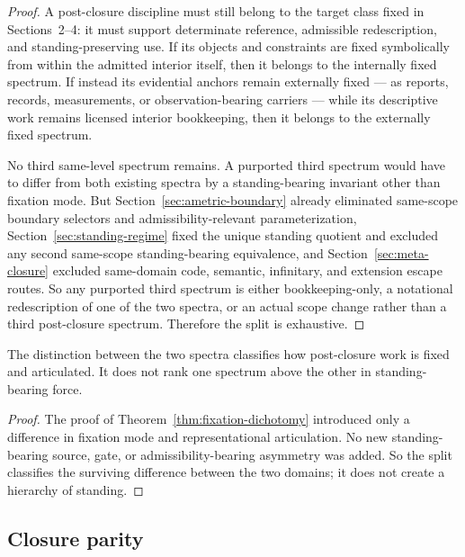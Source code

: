 \begin{proof}
A post-closure discipline must still belong to the target class fixed in Sections~2--4: it must support determinate reference, admissible redescription, and standing-preserving use. If its objects and constraints are fixed symbolically from within the admitted interior itself, then it belongs to the internally fixed spectrum. If instead its evidential anchors remain externally fixed --- as reports, records, measurements, or observation-bearing carriers --- while its descriptive work remains licensed interior bookkeeping, then it belongs to the externally fixed spectrum.

No third same-level spectrum remains. A purported third spectrum would have to differ from both existing spectra by a standing-bearing invariant other than fixation mode. But Section~\ref{sec:ametric-boundary} already eliminated same-scope boundary selectors and admissibility-relevant parameterization, Section~\ref{sec:standing-regime} fixed the unique standing quotient and excluded any second same-scope standing-bearing equivalence, and Section~\ref{sec:meta-closure} excluded same-domain code, semantic, infinitary, and extension escape routes. So any purported third spectrum is either bookkeeping-only, a notational redescription of one of the two spectra, or an actual scope change rather than a third post-closure spectrum. Therefore the split is exhaustive.
\end{proof}

\begin{corollary}
\label{cor:fixation-classificatory}
The distinction between the two spectra classifies how post-closure work is fixed and articulated. It does not rank one spectrum above the other in standing-bearing force.
\end{corollary}

\begin{proof}
The proof of Theorem~\ref{thm:fixation-dichotomy} introduced only a difference in fixation mode and representational articulation. No new standing-bearing source, gate, or admissibility-bearing asymmetry was added. So the split classifies the surviving difference between the two domains; it does not create a hierarchy of standing.
\end{proof}

\subsection{Closure parity}

